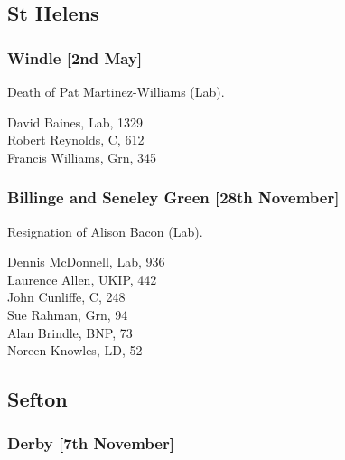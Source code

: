 \documentclass[a4paper,openany,10pt]{book}
\begin{document}
\subsection*{St Helens}

\subsubsection*{Windle \hspace*{\fill}\nolinebreak[1]%
\enspace\hspace*{\fill}
[2nd May]}


Death of Pat Martinez-Williams (Lab).



David Baines, Lab, 1329\\
Robert Reynolds, C, 612\\
Francis Williams, Grn, 345\\


\subsubsection*{Billinge and Seneley Green \hspace*{\fill}\nolinebreak[1]%
\enspace\hspace*{\fill}
[28th November]}


Resignation of Alison Bacon (Lab).



Dennis McDonnell, Lab, 936\\
Laurence Allen, UKIP, 442\\
John Cunliffe, C, 248\\
Sue Rahman, Grn, 94\\
Alan Brindle, BNP, 73\\
Noreen Knowles, LD, 52\\


\subsection*{Sefton}

\subsubsection*{Derby \hspace*{\fill}\nolinebreak[1]%
\enspace\hspace*{\fill}
[7th November]}
\end{document}

